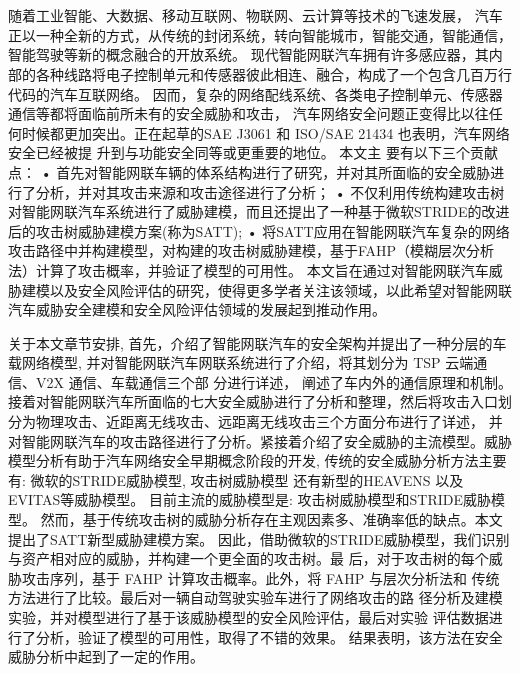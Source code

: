 \vspace{-2.5cm}
\chapter*{\xiaosan {}}
\hspace{-0.5cm}
随着工业智能、大数据、移动互联网、物联网、云计算等技术的飞速发展，
汽车正以一种全新的方式，从传统的封闭系统，转向智能城市，智能交通，智能通信，智能驾驶等新的概念融合的开放系统。
现代智能网联汽车拥有许多感应器，其内部的各种线路将电子控制单元和传感器彼此相连、融合，构成了一个包含几百万行代码的汽车互联网络。
因而，复杂的网络配线系统、各类电子控制单元、传感器通信等都将面临前所未有的安全威胁和攻击，
汽车网络安全问题正变得比以往任何时候都更加突出。正在起草的SAE J3061 和 ISO/SAE 21434 也表明，汽车网络安全已经被提
升到与功能安全同等或更重要的地位。
\newline
本文主 要有以下三个贡献点：
\newline
• 首先对智能网联车辆的体系结构进行了研究，并对其所面临的安全威胁进行了分析，并对其攻击来源和攻击途径进行了分析； 
\newline
• 不仅利用传统构建攻击树对智能网联汽车系统进行了威胁建模，而且还提出了一种基于微软STRIDE的改进后的攻击树威胁建模方案(称为SATT);
\newline
• 将SATT应用在智能网联汽车复杂的网络攻击路径中并构建模型，对构建的攻击树威胁建模，基于FAHP（模糊层次分析法）计算了攻击概率，并验证了模型的可用性。
\newline
本文旨在通过对智能网联汽车威胁建模以及安全风险评估的研究，使得更多学者关注该领域，以此希望对智能网联汽车威胁安全建模和安全风险评估领域的发展起到推动作用。
\newline

关于本文章节安排, 首先，介绍了智能网联汽车的安全架构并提出了一种分层的车载网络模型, 
并对智能网联汽车网联系统进行了介绍，将其划分为 TSP 云端通信、V2X 通信、车载通信三个部 分进行详述，
阐述了车内外的通信原理和机制。
接着对智能网联汽车所面临的七大安全威胁进行了分析和整理，然后将攻击入口划分为物理攻击、近距离无线攻击、远距离无线攻击三个方面分布进行了详述，
并对智能网联汽车的攻击路径进行了分析。紧接着介绍了安全威胁的主流模型。威胁模型分析有助于汽车网络安全早期概念阶段的开发,
传统的安全威胁分析方法主要有: 微软的STRIDE威胁模型, 攻击树威胁模型 还有新型的HEAVENS 以及 EVITAS等威胁模型。 
目前主流的威胁模型是: 攻击树威胁模型和STRIDE威胁模型。
然而，基于传统攻击树的威胁分析存在主观因素多、准确率低的缺点。本文提出了SATT新型威胁建模方案。
因此，借助微软的STRIDE威胁模型，我们识别与资产相对应的威胁，并构建一个更全面的攻击树。最
后，对于攻击树的每个威胁攻击序列，基于 FAHP 计算攻击概率。此外，将 FAHP 与层次分析法和
传统方法进行了比较。最后对一辆自动驾驶实验车进行了网络攻击的路
径分析及建模实验，并对模型进行了基于该威胁模型的安全风险评估，最后对实验
评估数据进行了分析，验证了模型的可用性，取得了不错的效果。
结果表明，该方法在安全威胁分析中起到了一定的作用。

 